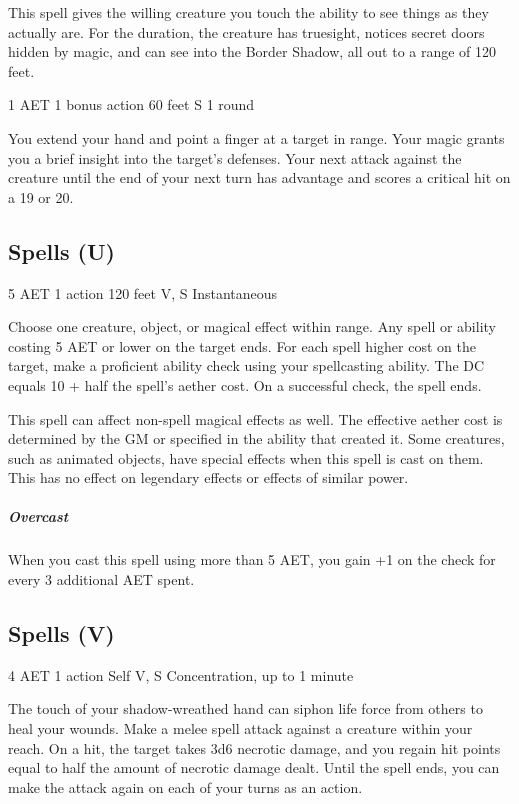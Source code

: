 This spell gives the willing creature you touch the ability to see things as they actually are. For the duration, the creature has truesight, notices secret doors hidden by magic, and can see into the Border Shadow, all out to a range of 120 feet.


{1 AET}
{1 bonus action}
{60 feet}
{S}
{1 round}

You extend your hand and point a finger at a target in range. Your magic grants you a brief insight into the target's defenses. Your next attack against the creature until the end of your next turn has advantage and scores a critical hit on a 19 or 20. 

\subsection{Spells (U)}

{5 AET}
{1 action}
{120 feet}
{V, S}
{Instantaneous}

Choose one creature, object, or magical effect within range. Any spell or ability costing 5 AET or lower on the target ends. For each spell higher cost on the target, make a proficient ability check using your spellcasting ability. The DC equals 10 + half the spell's aether cost. On a successful check, the spell ends.

This spell can affect non-spell magical effects as well. The effective aether cost is determined by the GM or specified in the ability that created it. Some creatures, such as animated objects, have special effects when this spell is cast on them. This has no effect on legendary effects or effects of similar power.

\subparagraph*{Overcast} When you cast this spell using more than 5 AET, you gain +1 on the check for every 3 additional AET spent.

\subsection{Spells (V)}

{4 AET}
{1 action}
{Self}
{V, S}
{Concentration, up to 1 minute}

The touch of your shadow-wreathed hand can siphon life force from others to heal your wounds. Make a melee spell attack against a creature within your reach. On a hit, the target takes 3d6 necrotic damage, and you regain hit points equal to half the amount of necrotic damage dealt. Until the spell ends, you can make the attack again on each of your turns as an action.

